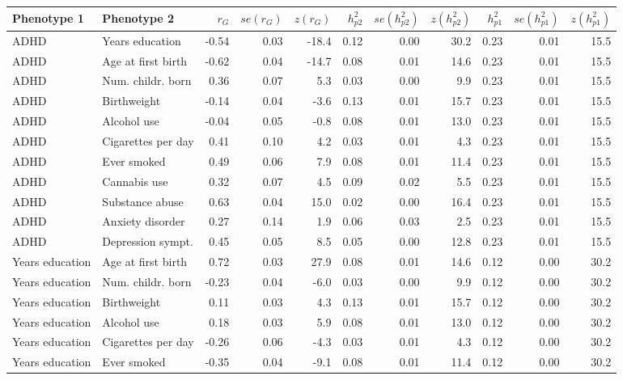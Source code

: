 {
	\setlength\tabcolsep{3pt}
	\renewcommand{\arraystretch}{0.6}
	\begin{longtable}{llrrrrrrrrr}
		\hline
		Phenotype 1 & Phenotype 2 & $r_G$ & $se(r_G)$ & $z(r_G)$ & $h^2_{p2}$ & $se(h^2_{p2})$ & $z(h^2_{p2})$ & $h^2_{p1}$ & $se(h^2_{p1})$ & $z(h^2_{p1})$ \\ 
		\hline
		\endhead
ADHD & Years education & -0.54 & 0.03 & -18.4 & 0.12 & 0.00 & 30.2 & 0.23 & 0.01 & 15.5 \\ 
  ADHD & Age at first birth & -0.62 & 0.04 & -14.7 & 0.08 & 0.01 & 14.6 & 0.23 & 0.01 & 15.5 \\ 
  ADHD & Num. childr. born & 0.36 & 0.07 & 5.3 & 0.03 & 0.00 & 9.9 & 0.23 & 0.01 & 15.5 \\ 
  ADHD & Birthweight & -0.14 & 0.04 & -3.6 & 0.13 & 0.01 & 15.7 & 0.23 & 0.01 & 15.5 \\ 
  ADHD & Alcohol use & -0.04 & 0.05 & -0.8 & 0.08 & 0.01 & 13.0 & 0.23 & 0.01 & 15.5 \\ 
  ADHD & Cigarettes per day & 0.41 & 0.10 & 4.2 & 0.03 & 0.01 & 4.3 & 0.23 & 0.01 & 15.5 \\ 
  ADHD & Ever smoked & 0.49 & 0.06 & 7.9 & 0.08 & 0.01 & 11.4 & 0.23 & 0.01 & 15.5 \\ 
  ADHD & Cannabis use & 0.32 & 0.07 & 4.5 & 0.09 & 0.02 & 5.5 & 0.23 & 0.01 & 15.5 \\ 
  ADHD & Substance abuse & 0.63 & 0.04 & 15.0 & 0.02 & 0.00 & 16.4 & 0.23 & 0.01 & 15.5 \\ 
  ADHD & Anxiety disorder & 0.27 & 0.14 & 1.9 & 0.06 & 0.03 & 2.5 & 0.23 & 0.01 & 15.5 \\ 
  ADHD & Depression sympt. & 0.45 & 0.05 & 8.5 & 0.05 & 0.00 & 12.8 & 0.23 & 0.01 & 15.5 \\ 
  Years education & Age at first birth & 0.72 & 0.03 & 27.9 & 0.08 & 0.01 & 14.6 & 0.12 & 0.00 & 30.2 \\ 
  Years education & Num. childr. born & -0.23 & 0.04 & -6.0 & 0.03 & 0.00 & 9.9 & 0.12 & 0.00 & 30.2 \\ 
  Years education & Birthweight & 0.11 & 0.03 & 4.3 & 0.13 & 0.01 & 15.7 & 0.12 & 0.00 & 30.2 \\ 
  Years education & Alcohol use & 0.18 & 0.03 & 5.9 & 0.08 & 0.01 & 13.0 & 0.12 & 0.00 & 30.2 \\ 
  Years education & Cigarettes per day & -0.26 & 0.06 & -4.3 & 0.03 & 0.01 & 4.3 & 0.12 & 0.00 & 30.2 \\ 
  Years education & Ever smoked & -0.35 & 0.04 & -9.1 & 0.08 & 0.01 & 11.4 & 0.12 & 0.00 & 30.2 \\ 

\end{longtable}}
